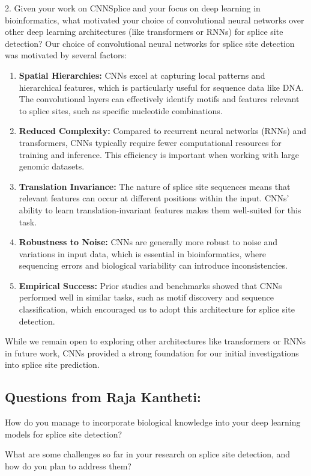 2. Given your work on CNNSplice and your focus on deep learning in bioinformatics, what motivated your choice of convolutional neural networks over other deep learning architectures (like transformers or RNNs) for splice site detection?
Our choice of convolutional neural networks for splice site detection was motivated by several factors:
\begin{enumerate}
    \item \textbf{Spatial Hierarchies:} CNNs excel at capturing local patterns and hierarchical features, which is particularly useful for sequence data like DNA. The convolutional layers can effectively identify motifs and features relevant to splice sites, such as specific nucleotide combinations.
    \item \textbf{Reduced Complexity:} Compared to recurrent neural networks (RNNs) and transformers, CNNs typically require fewer computational resources for training and inference. This efficiency is important when working with large genomic datasets.
    \item \textbf{Translation Invariance:} The nature of splice site sequences means that relevant features can occur at different positions within the input. CNNs’ ability to learn translation-invariant features makes them well-suited for this task.
    \item \textbf{Robustness to Noise:} CNNs are generally more robust to noise and variations in input data, which is essential in bioinformatics, where sequencing errors and biological variability can introduce inconsistencies.
    \item \textbf{Empirical Success:} Prior studies and benchmarks showed that CNNs performed well in similar tasks, such as motif discovery and sequence classification, which encouraged us to adopt this architecture for splice site detection.
\end{enumerate}

While we remain open to exploring other architectures like transformers or RNNs in future work, CNNs provided a strong foundation for our initial investigations into splice site prediction.

\subsection{Questions from Raja Kantheti: }
How do you manage to incorporate biological knowledge into your deep learning models for splice site detection?

What are some challenges so far in your research on splice site detection, and how do you plan to address them?
